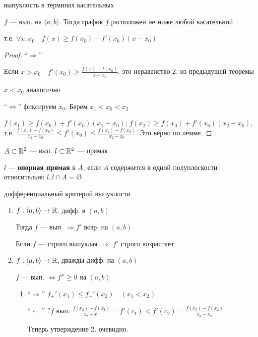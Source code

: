 \begin{theorem}
    выпуклость в терминах касательных

    $f$ --- вып. на $\langle a,b\rangle$. Тогда график $f$ расположен не ниже любой касательной

    т.е. $\forall x, x_0 \quad f(x)\geq f(x_0)+f'(x_0)(x-x_0)$
\end{theorem}

\begin{proof}
    ``$\Rightarrow$''
    
    Если $x>x_0 \quad f'(x_0)\geq\frac{f(x)-f(x_0)}{x-x_0}$, это неравенство 2. из предыдущей теоремы

    $x<x_0$ аналогично

    ``$\Leftrightarrow$'' фиксируем $x_0$. Берем $x_1<x_0<x_2$

    $f(x_1)\geq f(x_0)+f'(x_0)(x_1-x_0)$; $f(x_2)\geq f(x_0)+f'(x_0)(x_2-x_0)$, т.е. $\frac{f(x_1)-f(x_0)}{x_1-x_0}\leq f'(x_0)\leq \frac{f(x_2)-f(x_0)}{x_2-x_0}$. Это верно по лемме.
\end{proof}

\begin{definition}
    $A\subset \mathbb{R}^2$ --- вып. $l\subset \mathbb{R}^2$ --- прямая

    $l$ --- \textbf{опорная прямая} к $A$, если $A$ содержится в одной полуплоскости относительно $l, l\cap A=\text{\O}$
\end{definition}

\begin{theorem}
    дифференциальный критерий выпуклости

    \begin{enumerate}
        \item $f:\langle a,b\rangle\to\mathbb{R}$, дифф. в $(a,b)$
        
        Тогда $f$ --- вып. $\Rightarrow f'$ возр. на $(a,b)$

        Если $f$ --- строго выпуклая $\Rightarrow$ $f'$ строго возрастает

        \item $f:\langle a,b\rangle\to\mathbb{R}$, дважды дифф. на $(a,b)$
        
        $f$ --- вып. $\Leftrightarrow f''\geq0$ на $(a,b)$
        \begin{enumerate}
            \item ``$\Rightarrow$'' $f_+'(x_1)\leq f_-'(x_2) \quad (x_1<x_2)$
            
            ``$\Leftarrow$'' $?f$ вып. $\frac{f(x_2)-f(x_1)}{x_2-x_1}=f'(c_1)<f'(c_2)=\frac{f(x_3)-f(x_2)}{x_3-x_2}$

            Теперь утверждение 2. очевидно.
        \end{enumerate}
    \end{enumerate}
\end{theorem}


